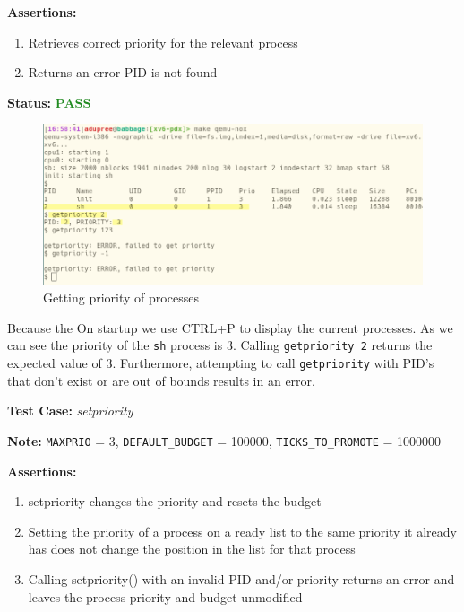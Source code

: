 \documentclass[11pt,letterpaper]{report}
\newcommand{\code}[1]{\colorbox{codegray}{\texttt{#1}}}
\begin{document}
{  \noindent\textbf{Assertions:}
  \begin{enumerate}[]
  \item Retrieves correct priority for the relevant process
  \item Returns an error PID is not found
  \end{enumerate}  

  \noindent\textbf{Status:} \textcolor{ForestGreen}{\textbf{PASS}}
  
  \begin{figure}[h!]
	\centering
	\includegraphics[width=1\linewidth]{get-priority.png}
	\caption[img]{Getting priority of processes}
	\label{fig:P1compileP0-1}
  \end{figure}

  Because the On startup we use CTRL+P to display the current processes. As we can see the priority of the 
  \code{sh} process is 3. Calling \code{getpriority 2} returns the expected value of 3. Furthermore, 
  attempting to call \code{getpriority} with PID's that don't exist or are out of bounds results in 
  an error. 

  \pagebreak

  
  \noindent\textbf{Test Case:} \emph{setpriority}
  
  \noindent\textbf{Note:} \code{MAXPRIO} = 3, \code{DEFAULT\_BUDGET} = 100000, \code{TICKS\_TO\_PROMOTE} = 1000000

  \noindent\textbf{Assertions:}
  \begin{enumerate}[]
  \item setpriority changes the priority and resets the budget
  \item Setting the priority of a process on a ready list to the same priority it already
        has does not change the position in the list for that process
  \item Calling setpriority() with an invalid PID and/or priority returns an error and leaves the 
        process priority and budget unmodified
  \end{enumerate}  
  
}
\end{document}
